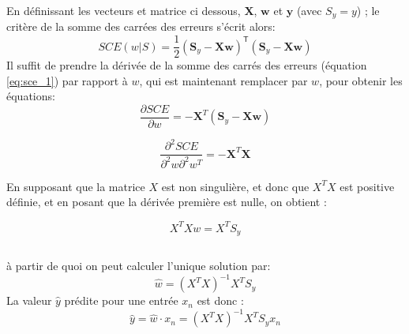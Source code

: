 		En définissant les vecteurs  et matrice ci dessous, ${\boldsymbol X}$, ${\boldsymbol w}$ et ${\boldsymbol y}$ (avec ${S_y = y}$) \cite{antoine2018apprentissage}; le critère de la somme des carrées des erreurs s'écrit alors:
		\begin{equation}\label{eq:sce_2}
			SCE(w|\mathit{S}) = \frac{1}{2} ({\boldsymbol S_y }- \mathbf{X}\boldsymbol w)^{\mathsf{T}}({ \boldsymbol S_y }- \mathbf{X} \boldsymbol w)
		\end{equation}  
		Il suffit de prendre la dérivée de la somme des carrés des erreurs (équation \ref{eq:sce_1}) par rapport à $w$, qui est maintenant remplacer par $w$, pour obtenir les équations: 
		$$
			\frac{\partial SCE}{\partial w} = -{\boldsymbol X}^T({\boldsymbol S_y }- \mathbf{X} \boldsymbol w)
		$$
		
		$$
		\frac{\partial^2 SCE}{\partial^2 w \partial^2 w^T} = -{\boldsymbol X}^T{\boldsymbol X}
		$$
		
		En supposant que la matrice $X$ est non singulière, et donc que $X^TX$ est positive définie, et en posant que la dérivée première est nulle, on obtient :
		
		
		\begin{equation}
			{X^{T} Xw =  X^{T} S_y}
		\end{equation}
		\begin{tabular}{lr}
			
		\end{tabular}
	
		à partir de quoi on peut calculer l'unique solution par: 
		\begin{equation}
			\hat{w} = {(X^{T} X)^{-1} X^{T} S_y}
		\end{equation}
		La valeur $\hat{y}$ prédite pour une entrée $x_n$ est donc : 
		$$
			\hat{y} = \hat{w}\cdot x_n = {(X^{T} X)^{-1} X^{T} S_y}x_n 
		$$ 
		
		
			

